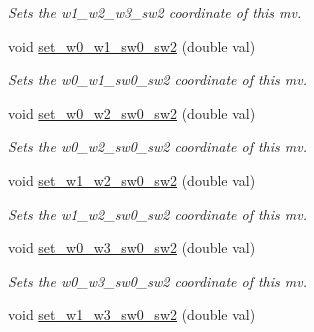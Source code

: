 \begin{DoxyCompactItemize}
\begin{DoxyCompactList}\small\item\em Sets the w1\-\_\-w2\-\_\-w3\-\_\-sw2 coordinate of this mv. \end{DoxyCompactList}\item 
\hypertarget{classe3ga_1_1mv_ae95fcf01980531a1c7fba3dc3e2604e3}{void \hyperlink{classe3ga_1_1mv_ae95fcf01980531a1c7fba3dc3e2604e3}{set\-\_\-w0\-\_\-w1\-\_\-sw0\-\_\-sw2} (double val)}\label{classe3ga_1_1mv_ae95fcf01980531a1c7fba3dc3e2604e3}

\begin{DoxyCompactList}\small\item\em Sets the w0\-\_\-w1\-\_\-sw0\-\_\-sw2 coordinate of this mv. \end{DoxyCompactList}\item 
\hypertarget{classe3ga_1_1mv_a252fe196303f4e359eb700ce6ec8823a}{void \hyperlink{classe3ga_1_1mv_a252fe196303f4e359eb700ce6ec8823a}{set\-\_\-w0\-\_\-w2\-\_\-sw0\-\_\-sw2} (double val)}\label{classe3ga_1_1mv_a252fe196303f4e359eb700ce6ec8823a}

\begin{DoxyCompactList}\small\item\em Sets the w0\-\_\-w2\-\_\-sw0\-\_\-sw2 coordinate of this mv. \end{DoxyCompactList}\item 
\hypertarget{classe3ga_1_1mv_a2e0f92e32b71b0d2d558986803ef9b3f}{void \hyperlink{classe3ga_1_1mv_a2e0f92e32b71b0d2d558986803ef9b3f}{set\-\_\-w1\-\_\-w2\-\_\-sw0\-\_\-sw2} (double val)}\label{classe3ga_1_1mv_a2e0f92e32b71b0d2d558986803ef9b3f}

\begin{DoxyCompactList}\small\item\em Sets the w1\-\_\-w2\-\_\-sw0\-\_\-sw2 coordinate of this mv. \end{DoxyCompactList}\item 
\hypertarget{classe3ga_1_1mv_a371551b3082d213c9548cbe863d56159}{void \hyperlink{classe3ga_1_1mv_a371551b3082d213c9548cbe863d56159}{set\-\_\-w0\-\_\-w3\-\_\-sw0\-\_\-sw2} (double val)}\label{classe3ga_1_1mv_a371551b3082d213c9548cbe863d56159}

\begin{DoxyCompactList}\small\item\em Sets the w0\-\_\-w3\-\_\-sw0\-\_\-sw2 coordinate of this mv. \end{DoxyCompactList}\item 
\hypertarget{classe3ga_1_1mv_ad16e890e9788dcc85462c8694c2f6c2e}{void \hyperlink{classe3ga_1_1mv_ad16e890e9788dcc85462c8694c2f6c2e}{set\-\_\-w1\-\_\-w3\-\_\-sw0\-\_\-sw2} (double val)}\label{classe3ga_1_1mv_ad16e890e9788dcc85462c8694c2f6c2e}


\end{DoxyCompactItemize}
